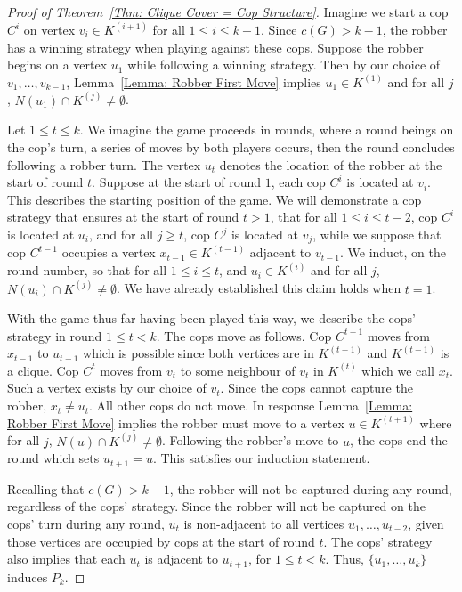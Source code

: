 \documentclass[12pt]{amsart}
\theoremstyle{definition}
\begin{document}
\begin{proof}[Proof of Theorem~\ref{Thm: Clique Cover = Cop Structure}]
    
    Imagine we start a cop $C^{i}$ on vertex
    $v_i \in K^{(i+1)}$ for all $1\leq i \leq k-1$.
    Since $c(G) > k-1$, the robber has a winning strategy when playing against these cops.
    Suppose the robber begins on a vertex $u_1$ while following a winning strategy.
    Then by our choice of $v_1,\dots, v_{k-1}$, Lemma~\ref{Lemma: Robber First Move} implies $u_1 \in K^{(1)}$ and for all $j$, $N(u_1) \cap K^{(j)} \neq \emptyset$.


    Let $1\leq t \leq k$.
    We imagine the game proceeds in rounds, where a round beings on the cop's turn, a series of moves by both players occurs, then the round concludes following a robber turn.
    The vertex $u_{t}$ denotes the location of the robber at the start of round $t$.
    Suppose at the start of round $1$, each cop $C^i$ is located at $v_i$. 
    This describes the starting position of the game.
    We will demonstrate a cop strategy that ensures at the start of round $t>1$,  that for all $1 \leq i \leq t-2$, cop $C^i$ is located at $u_i$, and for all $j\geq t$, cop $C^j$ is located at $v_j$,
    while we suppose that cop $C^{t-1}$ occupies a vertex $x_{t-1}\in K^{(t-1)}$ adjacent to $v_{t-1}$.
    We induct, on the round number, so that for all $1\leq i \leq t$, and $u_{i} \in K^{(i)}$ and for all $j$, $N(u_{i}) \cap K^{(j)} \neq \emptyset$.
    We have already established this claim holds when $t=1$.


    With the game thus far having been played this way,
    we describe the cops' strategy in round $1\leq t < k$.
    The cops move as follows. 
    Cop $C^{t-1}$ moves from $x_{t-1}$ to $u_{t-1}$ which is possible since both vertices are in $K^{(t-1)}$ and $K^{(t-1)}$ is a clique.
    Cop $C^t$ moves from $v_t$ to some neighbour of $v_t$ in $K^{(t)}$ which we call $x_t$. 
    Such a vertex exists by our choice of $v_t$.
    Since the cops cannot capture the robber, $x_t \neq u_t$.
    All other cops do not move.
    In response Lemma~\ref{Lemma: Robber First Move} implies the robber must move to a vertex $u \in K^{(t+1)}$ where for all $j$, $N(u) \cap K^{(j)} \neq \emptyset$.
    Following the robber's move to $u$, the cops end the round which sets $u_{t+1} = u$.
    This satisfies our induction statement.

    Recalling that $c(G) > k-1$, the robber will not be captured during any round, regardless of the cops' strategy.
    Since the robber will not be captured on the cops' turn during any round,
    $u_t$ is non-adjacent to all vertices $u_1,\dots, u_{t-2}$, given those vertices are occupied by cops at the start of round $t$.
    The cops' strategy also implies that each $u_t$ is adjacent to $u_{t+1}$, for $1\leq t < k$.
    Thus, $\{u_1,\dots, u_{k}\}$ induces $P_k$.



\end{proof}
\end{document}
